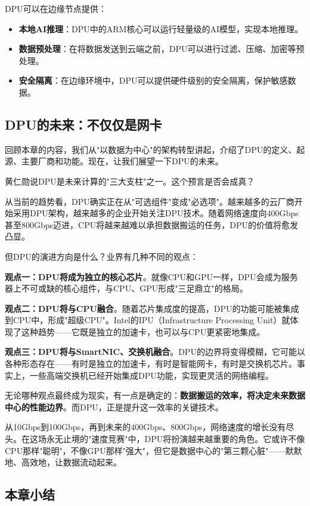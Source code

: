 DPU可以在边缘节点提供：

\begin{itemize}
    \item \textbf{本地AI推理}：DPU中的ARM核心可以运行轻量级的AI模型，实现本地推理。
    \item \textbf{数据预处理}：在将数据发送到云端之前，DPU可以进行过滤、压缩、加密等预处理。
    \item \textbf{安全隔离}：在边缘环境中，DPU可以提供硬件级别的安全隔离，保护敏感数据。
\end{itemize}

\subsection{DPU的未来：不仅仅是网卡}

回顾本章的内容，我们从"以数据为中心"的架构转型讲起，介绍了DPU的定义、起源、主要厂商和功能。现在，让我们展望一下DPU的未来。

黄仁勋说DPU是未来计算的"三大支柱"之一。这个预言是否会成真？

从当前的趋势看，DPU确实正在从"可选组件"变成"必选项"。越来越多的云厂商开始采用DPU架构，越来越多的企业开始关注DPU技术。随着网络速度向400Gbps甚至800Gbps迈进，CPU将越来越难以承担数据搬运的任务，DPU的价值将愈发凸显。

但DPU的演进方向是什么？业界有几种不同的观点：

\textbf{观点一：DPU将成为独立的核心芯片}。就像CPU和GPU一样，DPU会成为服务器上不可或缺的核心组件，与CPU、GPU形成"三足鼎立"的格局。

\textbf{观点二：DPU将与CPU融合}。随着芯片集成度的提高，DPU的功能可能被集成到CPU中，形成"超级CPU"。Intel的IPU（Infrastructure Processing Unit）就体现了这种趋势——它既是独立的加速卡，也可以与CPU更紧密地集成。

\textbf{观点三：DPU将与SmartNIC、交换机融合}。DPU的边界将变得模糊，它可能以各种形态存在——有时是独立的加速卡，有时是智能网卡，有时是交换机芯片。事实上，一些高端交换机已经开始集成DPU功能，实现更灵活的网络编程。

无论哪种观点最终成为现实，有一点是确定的：\textbf{数据搬运的效率，将决定未来数据中心的性能边界}。而DPU，正是提升这一效率的关键技术。

从10Gbps到100Gbps，再到未来的400Gbps、800Gbps，网络速度的增长没有尽头。在这场永无止境的"速度竞赛"中，DPU将扮演越来越重要的角色。它或许不像CPU那样"聪明"，不像GPU那样"强大"，但它是数据中心的"第三颗心脏"——默默地、高效地，让数据流动起来。

\subsection{本章小结}

